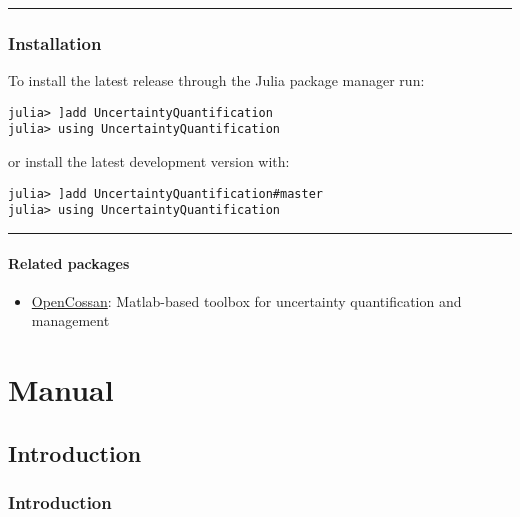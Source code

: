 {\rule{\textwidth}{1pt}}


\section{Installation}



\label{16848947351613073531}{}


To install the latest release through the Julia package manager run:




\begin{verbatim}
julia> ]add UncertaintyQuantification
julia> using UncertaintyQuantification
\end{verbatim}



or install the latest development version with:




\begin{verbatim}
julia> ]add UncertaintyQuantification#master
julia> using UncertaintyQuantification
\end{verbatim}



{\rule{\textwidth}{1pt}}


\subsection{Related packages}



\label{5607455135763110590}{}


\begin{itemize}
\item \href{https://github.com/cossan-working-group/OpenCossan}{OpenCossan}: Matlab-based toolbox for uncertainty quantification and management

\end{itemize}


\part{Manual}


\chapter{Introduction}


\section{Introduction}



